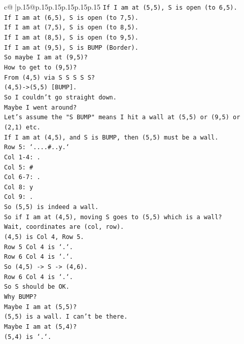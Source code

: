 \documentclass{article}
\begin{document}
{\begin{supertabular}{c@{$\;$}|p{.15\linewidth}@{}p{.15\linewidth}p{.15\linewidth}p{.15\linewidth}p{.15\linewidth}p{.15\linewidth}}
{{{\texttt{If I am at (5,5), S is open (to 6,5).} \\
\texttt{If I am at (6,5), S is open (to 7,5).} \\
\texttt{If I am at (7,5), S is open (to 8,5).} \\
\texttt{If I am at (8,5), S is open (to 9,5).} \\
\texttt{If I am at (9,5), S is BUMP (Border).} \\
\texttt{So maybe I am at (9,5)?} \\
\texttt{How to get to (9,5)?} \\
\texttt{From (4,5) via S S S S S?} \\
\texttt{(4,5){-}>(5,5) {[}BUMP{]}.} \\
\texttt{So I couldn't go straight down.} \\
\texttt{Maybe I went around?} \\
\texttt{Let's assume the "S BUMP" means I hit a wall at (5,5) or (9,5) or (2,1) etc.} \\
\texttt{If I am at (4,5), and S is BUMP, then (5,5) must be a wall.} \\
\texttt{Row 5: `....\#..y.`} \\
\texttt{Col 1{-}4: .} \\
\texttt{Col 5: \#} \\
\texttt{Col 6{-}7: .} \\
\texttt{Col 8: y} \\
\texttt{Col 9: .} \\
\texttt{So (5,5) is indeed a wall.} \\
\texttt{So if I am at (4,5), moving S goes to (5,5) which is a wall?} \\
\texttt{Wait, coordinates are (col, row).} \\
\texttt{(4,5) is Col 4, Row 5.} \\
\texttt{Row 5 Col 4 is `.`.} \\
\texttt{Row 6 Col 4 is `.`.} \\
\texttt{So (4,5) {-}> S {-}> (4,6).} \\
\texttt{Row 6 Col 4 is `.`.} \\
\texttt{So S should be OK.} \\
\texttt{Why BUMP?} \\
\texttt{Maybe I am at (5,5)?} \\
\texttt{(5,5) is a wall. I can't be there.} \\
\texttt{Maybe I am at (5,4)?} \\
\texttt{(5,4) is `.`.} \\
}}}
\end{supertabular}}
\end{document}
